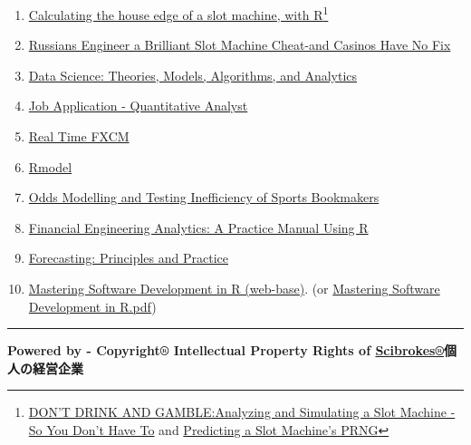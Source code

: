 \documentclass[]{book}
\providecommand{\tightlist}{%
  \setlength{\itemsep}{0pt}\setlength{\parskip}{0pt}}
\let\rmarkdownfootnote\footnote%
\def\footnote{\protect\rmarkdownfootnote}
\begin{document}
\begin{enumerate}
\def\labelenumi{\arabic{enumi}.}
\tightlist
\item
  \href{https://www.r-bloggers.com/calculating-the-house-edge-of-a-slot-machine-with-r/}{Calculating
  the house edge of a slot machine, with R}\footnote{\href{http://giorasimchoni.com/2017/05/06/2017-05-06-don-t-drink-and-gamble/}{DON'T
    DRINK AND GAMBLE:Analyzing and Simulating a Slot Machine - So You
    Don't Have To} and
    \href{https://www.schneier.com/blog/archives/2017/02/predicting_a_sl.html}{Predicting
    a Slot Machine's PRNG}}
\item
  \href{https://www.wired.com/2017/02/russians-engineer-brilliant-slot-machine-cheat-casinos-no-fix/}{Russians
  Engineer a Brilliant Slot Machine Cheat-and Casinos Have No Fix}
\item
  \href{https://srdas.github.io/MLBook}{Data Science: Theories, Models,
  Algorithms, and Analytics}
\item
  \href{github.com/englianhu/binary.com-interview-question}{Job
  Application - Quantitative Analyst}
\item
  \href{https://github.com/scibrokes/real-time-fxcm}{Real Time FXCM}
\item
  \href{https://github.com/scibrokes/Rmodel}{Rmodel}
\item
  \href{https://github.com/scibrokes/odds-modelling-and-testing-inefficiency-of-sports-bookmakers}{Odds
  Modelling and Testing Inefficiency of Sports Bookmakers}
\item
  \href{https://bookdown.org/wfoote01/faur/}{Financial Engineering
  Analytics: A Practice Manual Using R}
\item
  \href{https://otexts.org/fpp2/}{Forecasting: Principles and Practice}
\item
  \href{https://bookdown.org/rdpeng/RProgDA/}{Mastering Software
  Development in R (web-base)}. (or
  \href{https://github.com/englianhu/Coursera-Mastering-Software-Development-in-R/blob/master/reference/Mastering\%20Software\%20Development\%20in\%20R.pdf}{Mastering
  Software Development in R.pdf})
\end{enumerate}

\begin{center}\rule{0.5\linewidth}{\linethickness}\end{center}

\textbf{Powered by - Copyright® Intellectual Property Rights of
\href{http://www.scibrokes.com}{Scibrokes®}個人の経営企業}


\end{document}
